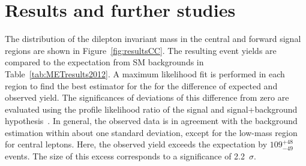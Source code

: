 \label{sec:counting}

\section{Results and further studies}

\label{sec:candcresults}
The distribution of the dilepton invariant mass in the central and forward signal regions are shown in Figure~\ref{fig:resultsCC}. The resulting event yields are compared to the expectation from SM backgrounds in Table~\ref{tab:METresults2012}. A maximum likelihood fit is performed in each region to find the best estimator for the for the difference of expected and observed yield. The significances of deviations of this difference from zero are evaluated using the profile likelihood ratio of the signal and signal+background hypothesis~\cite{HiggsTool1}. In general, the observed data is in agreement with the background estimation within about one standard deviation, except for the low-mass region for central leptons. Here, the observed yield exceeds the expectation by $109^{+48}_{-49}$ events. The size of this excess corresponds to a significance of 2.2~$\sigma$.  
